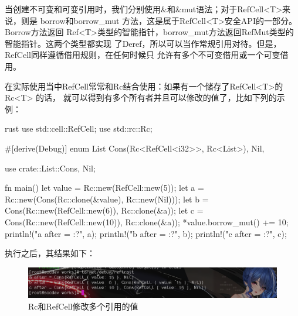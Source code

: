 当创建不可变和可变引用时，我们分别使用\&和\&mut语法；对于RefCell<T>来说，则是
borrow和borrow\_mut 方法，这是属于RefCell<T>安全API的一部分。Borrow方法返回
Ref<T>类型的智能指针，borrow\_mut方法返回RefMut类型的智能指针。这两个类型都实现
了Deref，所以可以当作常规引用对待。但是，RefCell同样遵循借用规则，在任何时候只
允许有多个不可变借用或一个可变借用。

在实际使用当中RefCell常常和Rc结合使用：如果有一个储存了RefCell<T>的 Rc<T> 的话，
就可以得到有多个所有者并且可以修改的值了，比如下列的示例：
\begin{code-block}{rust}
use std::cell::RefCell;
use std::rc::Rc;

#[derive(Debug)]
enum List {
    Cons(Rc<RefCell<i32>>, Rc<List>),
    Nil,
}

use crate::List::{Cons, Nil};

fn main() {
    let value = Rc::new(RefCell::new(5));
    let a = Rc::new(Cons(Rc::clone(&value), Rc::new(Nil)));
    let b = Cons(Rc::new(RefCell::new(6)), Rc::clone(&a));
    let c = Cons(Rc::new(RefCell::new(10)), Rc::clone(&a));
    *value.borrow_mut() += 10;
    println!("a after = {:?}", a);
    println!("b after = {:?}", b);
    println!("c after = {:?}", c);
}
\end{code-block}
执行之后，其结果如下：
\begin{figure}[H]
  \centering
  \includegraphics[width=\linewidth]{rust_ref_cell.png}
  \caption{Rc和RefCell修改多个引用的值}
  \label{fig:rust_ref_cell}
\end{figure}

